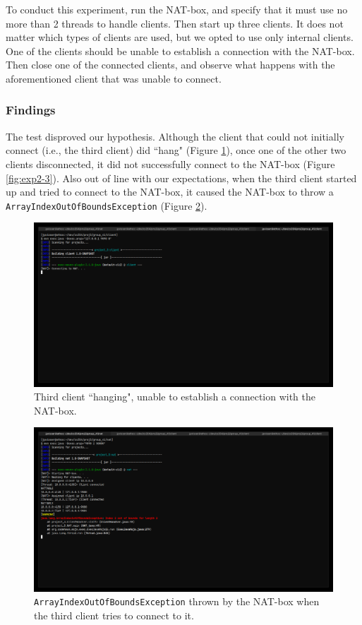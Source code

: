 \documentclass[10pt, a4paper]{article}
\begin{document}
To conduct this experiment, run the NAT-box, and specify that it must use no
more than 2 threads to handle clients. Then start up three clients. It does not
matter which types of clients are used, but we opted to use only internal
clients. One of the clients should be unable to establish a connection with the
NAT-box. Then close one of the connected clients, and observe what happens with
the aforementioned client that was unable to connect.


\subsubsection{Findings}
\label{sssec:toomanyfind}

The test disproved our hypothesis. Although the client that could not initially
connect (i.e., the third client) did ``hang" (Figure \ref{fig:exp2-1}), once one
of the other two clients disconnected, it did not successfully connect to the
NAT-box (Figure \ref{fig:exp2-3}). Also out of line with our expectations, when
the third client started up and tried to connect to the NAT-box, it caused the
NAT-box to throw a \texttt{ArrayIndexOutOfBoundsException} (Figure
\ref{fig:exp2-2}).

\begin{figure}
  \centering
  \includegraphics[width=12cm]{exp2-1}
  \caption{Third client ``hanging", unable to establish a connection with the
  NAT-box.}
  \label{fig:exp2-1}
\end{figure}

\begin{figure}
  \centering
  \includegraphics[width=12cm]{exp2-2}
  \caption{\texttt{ArrayIndexOutOfBoundsException} thrown by the NAT-box when
  the third client tries to connect to it.}
  \label{fig:exp2-2}
\end{figure}
\end{document}
